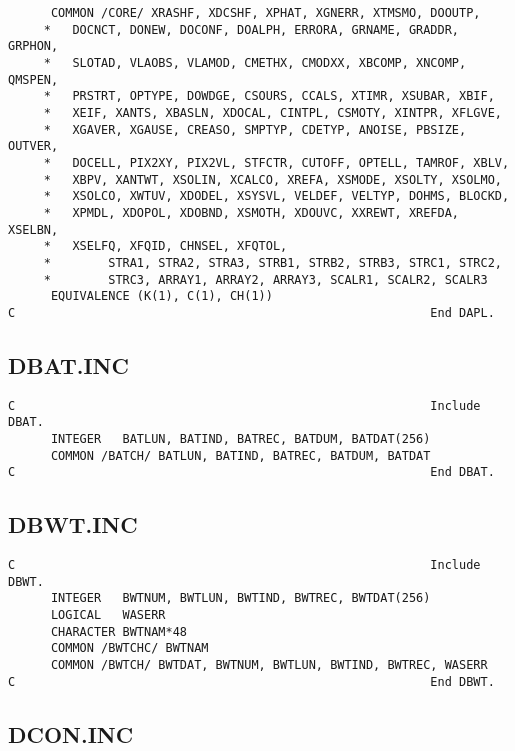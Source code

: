 \begin{verbatim}
      COMMON /CORE/ XRASHF, XDCSHF, XPHAT, XGNERR, XTMSMO, DOOUTP,
     *   DOCNCT, DONEW, DOCONF, DOALPH, ERRORA, GRNAME, GRADDR, GRPHON,
     *   SLOTAD, VLAOBS, VLAMOD, CMETHX, CMODXX, XBCOMP, XNCOMP, QMSPEN,
     *   PRSTRT, OPTYPE, DOWDGE, CSOURS, CCALS, XTIMR, XSUBAR, XBIF,
     *   XEIF, XANTS, XBASLN, XDOCAL, CINTPL, CSMOTY, XINTPR, XFLGVE,
     *   XGAVER, XGAUSE, CREASO, SMPTYP, CDETYP, ANOISE, PBSIZE, OUTVER,
     *   DOCELL, PIX2XY, PIX2VL, STFCTR, CUTOFF, OPTELL, TAMROF, XBLV,
     *   XBPV, XANTWT, XSOLIN, XCALCO, XREFA, XSMODE, XSOLTY, XSOLMO,
     *   XSOLCO, XWTUV, XDODEL, XSYSVL, VELDEF, VELTYP, DOHMS, BLOCKD,
     *   XPMDL, XDOPOL, XDOBND, XSMOTH, XDOUVC, XXREWT, XREFDA, XSELBN,
     *   XSELFQ, XFQID, CHNSEL, XFQTOL,
     *        STRA1, STRA2, STRA3, STRB1, STRB2, STRB3, STRC1, STRC2,
     *        STRC3, ARRAY1, ARRAY2, ARRAY3, SCALR1, SCALR2, SCALR3
      EQUIVALENCE (K(1), C(1), CH(1))
C                                                          End DAPL.

\end{verbatim}
\subsection{DBAT.INC}

\begin{verbatim}
C                                                          Include DBAT.
      INTEGER   BATLUN, BATIND, BATREC, BATDUM, BATDAT(256)
      COMMON /BATCH/ BATLUN, BATIND, BATREC, BATDUM, BATDAT
C                                                          End DBAT.

\end{verbatim}
\subsection{DBWT.INC}

\begin{verbatim}
C                                                          Include DBWT.
      INTEGER   BWTNUM, BWTLUN, BWTIND, BWTREC, BWTDAT(256)
      LOGICAL   WASERR
      CHARACTER BWTNAM*48
      COMMON /BWTCHC/ BWTNAM
      COMMON /BWTCH/ BWTDAT, BWTNUM, BWTLUN, BWTIND, BWTREC, WASERR
C                                                          End DBWT.

\end{verbatim}
\subsection{DCON.INC}

